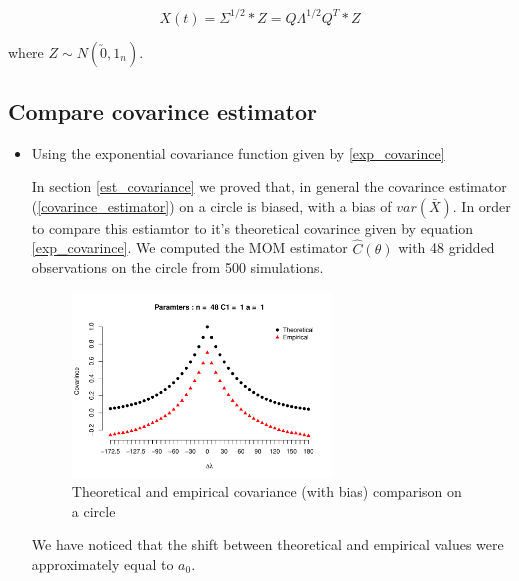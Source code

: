 \[
	X(t) = \Sigma^{1/2}*Z = Q\Lambda^{1/2}Q^T*Z 
\]

where $Z\sim N(\utilde{0},1_{n})$.

\subsection{Compare covarince estimator} 

\begin{itemize}
	
	\item Using the exponential covariance function given by \ref{exp_covarince}
	      
	      In section \ref{est_covariance} we proved that, in general the covarince estimator (\ref{covarince_estimator}) on a circle is biased, with a bias of $var(\bar{X})$. In order to compare this estiamtor to it's theoretical covarince given by equation \ref{exp_covarince}. We computed the MOM estimator $\hat{C}(\theta)$ with 48 gridded observations on the circle from 500 simulations. 
	      
	      \begin{figure}[H] 
	      	\label{covarince_circle}
	      	\centering
	      	\includegraphics[width=0.65\textwidth]{graphs/covarince_circle}
	      	\caption {Theoretical and empirical covariance (with bias) comparison on a circle}
	      \end{figure}
	      
	      We have noticed that the shift between theoretical and empirical values were approximately equal to $a_0$.\\
	      
	      

\end{itemize}

